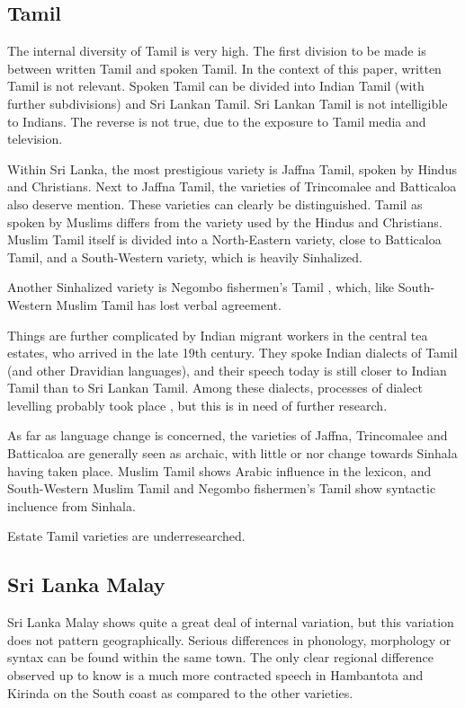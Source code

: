 \documentclass[handout,utf8]{article}
\begin{document}
\subsection{Tamil}
The internal diversity of Tamil is very high. The first division to be made is between written Tamil and spoken Tamil. In the context of this paper, written Tamil is not relevant. Spoken Tamil  can be divided into Indian Tamil (with further subdivisions) and Sri Lankan Tamil. Sri Lankan Tamil is not intelligible to Indians. The reverse is not true, due to the exposure to Tamil media and television. 

Within Sri Lanka, the most prestigious variety is Jaffna Tamil, spoken by Hindus and Christians. Next to Jaffna Tamil, the varieties of Trincomalee and Batticaloa also deserve mention. These varieties can clearly be distinguished. Tamil as spoken by Muslims differs from the variety used by the Hindus and Christians. Muslim Tamil itself is divided into a North-Eastern variety, close to Batticaloa Tamil, and a South-Western variety, which is heavily Sinhalized. 

Another Sinhalized variety is Negombo fishermen's Tamil \citep{Bonta}, which, like South-Western Muslim Tamil has lost verbal agreement. 

Things are further complicated by Indian migrant workers in the central tea estates, who arrived in the late 19th century. They spoke Indian dialects of Tamil (and other Dravidian languages), and their speech today is still closer to Indian Tamil than to Sri Lankan Tamil. Among these dialects, processes of dialect levelling probably took place \citet{abc}, but this is in need of further research. 

As far as language change is concerned, the varieties of Jaffna, Trincomalee and Batticaloa are generally seen as archaic, with little or nor change towards Sinhala having taken place. Muslim Tamil shows Arabic influence in the lexicon, and South-Western Muslim Tamil and Negombo fishermen's Tamil show syntactic incluence from Sinhala. 

Estate Tamil varieties are underresearched.


\subsection{Sri Lanka Malay}
Sri Lanka Malay shows quite a great deal of internal variation, but this variation does not pattern geographically. Serious differences in phonology, morphology or syntax can be found within the same town. The only clear regional difference observed up to know is a much more contracted speech in Hambantota and Kirinda on the South coast as compared to the other varieties. 
\end{document}
